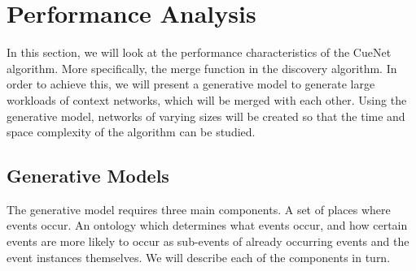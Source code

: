 

\section{Performance Analysis}
In this section, we will look at the performance characteristics of the CueNet algorithm. More specifically, the merge function in the discovery algorithm. In order to achieve this, we will present a generative model to generate large workloads of context networks, which will be merged with each other. Using the generative model, networks of varying sizes will be created so that the time and space complexity of the algorithm can be studied.

\subsection{Generative Models}
\label{section:generative_models}
The generative model requires three main components. A set of places where events occur. An ontology which determines what events occur, and how certain events are more likely to occur as sub-events of already occurring events and the event instances themselves. We will describe each of the components in turn. 



